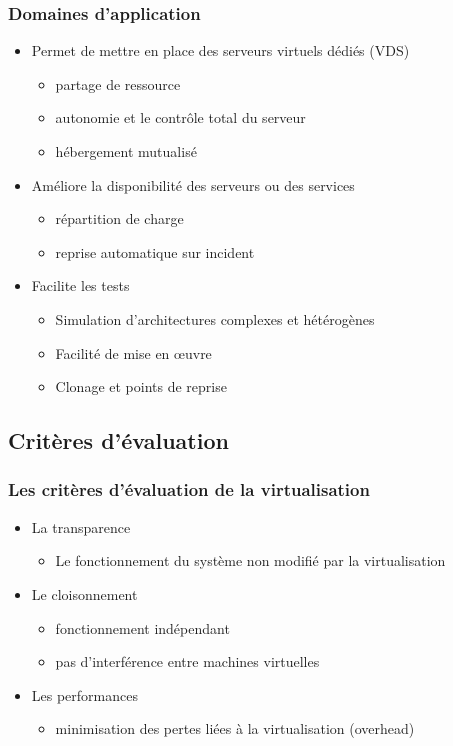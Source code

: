 \begin{frame}
\frametitle{Domaines d’application}
\begin{itemize}
  \item <1->Permet de mettre en place des serveurs virtuels dédiés (VDS)
   \begin{itemize}
  \item partage de ressource
  \item autonomie et le contrôle total du serveur
  \item hébergement mutualisé
\end{itemize}

\item <2->Améliore la disponibilité des serveurs ou des services
\begin{itemize}
  \item répartition de charge
\item reprise automatique sur incident

\end{itemize}
\item <3>Facilite les tests 
\begin{itemize}
  \item Simulation d'architectures complexes et hétérogènes
  \item Facilité de mise en œuvre
  \item Clonage et points de reprise
\end{itemize}

\end{itemize}
\end{frame}



\subsection{Critères d'évaluation}

\begin{frame}
\frametitle{Les critères d'évaluation de la virtualisation}
\begin{itemize}
\item La transparence
\begin{itemize}
\item Le fonctionnement du système non modifié par la virtualisation
\end{itemize}
\item Le cloisonnement
\begin{itemize}
\item fonctionnement indépendant
\item pas d'interférence entre machines virtuelles
\end{itemize}
\item Les performances
\begin{itemize}
\item minimisation des pertes liées à la virtualisation (overhead)
\end{itemize}
\end{itemize}
\end{frame}

